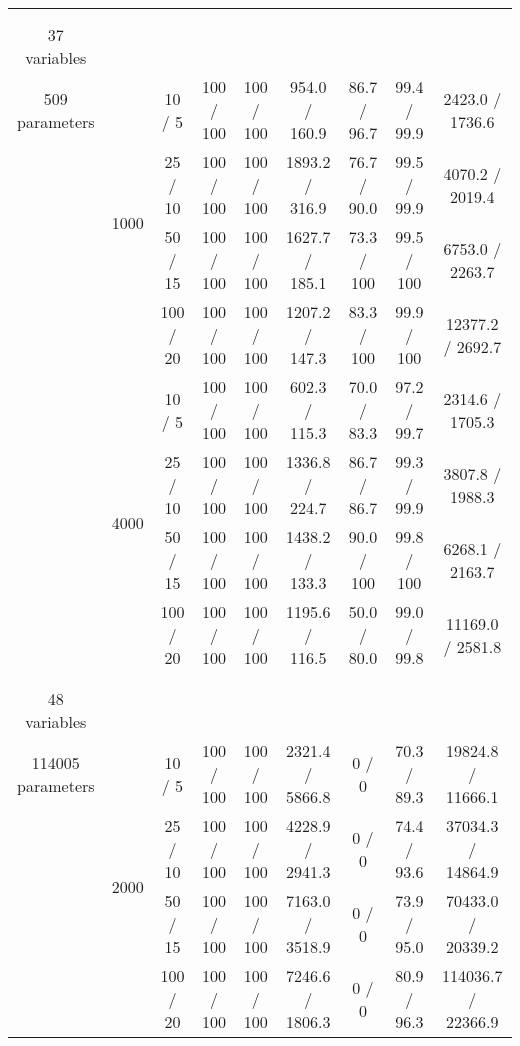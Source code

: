 \documentclass[twoside,11pt]{article}
\begin{document}
\begin{table}[H]
\begin{tabular}{  c | c | c || c | c | c || c | c | c }
\hhline{=|=|=||=|=|=|=|=|=}
\multirow{8}{*}{\thead{\textbf{alarm} \\ \\ 37 variables \\ 509 parameters}} & \multirow{4}{*}{1000} 
& 10 / 5 & 100 / 100 & 100 / 100 & 954.0 / 160.9 & \cellcolor{yellow!100} 86.7 / 96.7 & \cellcolor{yellow!100} 99.4 / 99.9 & 2423.0 / 1736.6 \\
& & 25 / 10 & 100 / 100  & 100 / 100 & 1893.2 / 316.9 & \cellcolor{yellow!100} 76.7 / 90.0 & \cellcolor{yellow!100} 99.5 / 99.9 & 4070.2 / 2019.4 \\
& & 50 / 15 & 100 / 100 & 100 / 100  & 1627.7 / 185.1 & \cellcolor{yellow!100} 73.3 / 100 & \cellcolor{yellow!100} 99.5 / 100 & 6753.0 / 2263.7  \\
& & 100 / 20 & 100 / 100 & 100 / 100 & 1207.2 / 147.3 & \cellcolor{yellow!100} 83.3 / 100 & \cellcolor{yellow!100} 99.9 / 100 & 12377.2 / 2692.7 \\

\hhline {~|-|-||-|-|-||-|-|-}
& \multirow{4}{*}{4000}
& 10 / 5 & 100 / 100 & 100 / 100 & 602.3 / 115.3 & \cellcolor{yellow!100} 70.0 / 83.3 & \cellcolor{yellow!100} 97.2 / 99.7 & 2314.6 / 1705.3  \\
& & 25 / 10 & 100 / 100  & 100 / 100 & 1336.8 / 224.7 & \cellcolor{yellow!100} 86.7 / 86.7 & \cellcolor{yellow!100} 99.3 / 99.9 & 3807.8 / 1988.3 \\
& & 50 / 15 & 100 / 100 & 100 / 100  & 1438.2 / 133.3 & \cellcolor{yellow!100} 90.0 / 100 & \cellcolor{yellow!100} 99.8 / 100 & 6268.1 / 2163.7 \\
& & 100 / 20 & 100 / 100 & 100 / 100 & 1195.6 / 116.5 & \cellcolor{yellow!100} 50.0 / 80.0 & \cellcolor{yellow!100} 99.0 / 99.8 & 11169.0 / 2581.8 \\

\hhline{=|=|=||=|=|=|=|=|=}
\multirow{8}{*}{\thead{\textbf{barley} \\ \\ 48 variables \\ 114005 parameters}} & \multirow{4}{*}{2000} 
& 10 / 5 & 100 / 100 & 100 / 100 & 2321.4 / 5866.8 & \cellcolor{yellow!100} 0 / 0 & \cellcolor{yellow!100} 70.3 / 89.3 & 19824.8 / 11666.1  \\
& & 25 / 10 & 100 / 100  & 100 / 100 & 4228.9 / 2941.3 & \cellcolor{yellow!100} 0 / 0 & \cellcolor{yellow!100} 74.4 / 93.6  & 37034.3 / 14864.9 \\
& & 50 / 15 & 100 / 100 & 100 / 100  & 7163.0 / 3518.9 & \cellcolor{yellow!100} 0 / 0 & \cellcolor{yellow!100} 73.9 / 95.0 & 70433.0 / 20339.2  \\
& & 100 / 20 & 100 / 100 & 100 / 100 & 7246.6 / 1806.3 & \cellcolor{yellow!100} 0 / 0 & \cellcolor{yellow!100} 80.9 / 96.3 & 114036.7 / 22366.9 \\


\end{tabular}
\end{table}
\end{document}
